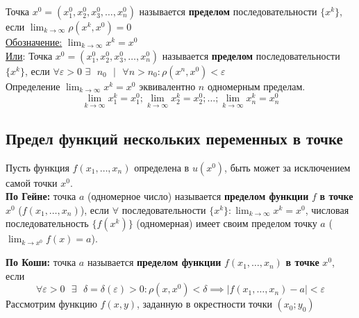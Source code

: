 \documentclass[12pt]{article}
\begin{document}
    Точка $x^0 = (x^0_1, x^0_2, x^0_3, \dots, x^0_n)$ называется \textbf{пределом} последовательности $\{x^k\}$, если $\lim_{k\to\infty} \rho(x^k, x^0) = 0$\\
    \underline{Обозначение:} $\lim_{k\to\infty}x^k=x^0$\\
    \underline{Или}: Точка $x^0 = (x^0_1, x^0_2, x^0_3, \dots, x^0_n)$ называется \textbf{пределом} последовательности $\{x^k\}$, если $\forall \varepsilon > 0$ $\exists \text{ } n_0 \text{ } \big| \text{ } \forall n > n_0 : \rho(x^n, x^0) < \varepsilon$\\
    Определение $\lim_{k\to\infty}x^k=x^0$ эквивалентно $n$ одномерным пределам.
    \[ \lim_{k\to\infty}x^k_1 = x^0_1; \lim_{k\to\infty}x^k_2 = x^0_2; \dots; \lim_{k\to\infty}x^k_n = x^0_n \]

    \subsection{Предел функций нескольких переменных в точке}
    \noindent Пусть функция $f(x_1, \dots, x_n)$ определена в $u(x^0)$, быть может за исключением самой точки $x^0$.\\
    \textbf{По Гейне:} точка $a$ (одномерное число) называется \textbf{пределом функции} $f$ \textbf{в точке} $x^0$ ($f(x_1, \dots, x_n)$), если $\forall$ последовательности $\{x^k\} : \lim_{k\to\infty}x^k=x^0$, числовая последовательность $\{ f(x^k) \}$ (одномерная) имеет своим пределом точку $a$ ($\lim_{k\to x^0}f(x)=a$).\par\noindent
    \textbf{По Коши:} точка $a$ называется \textbf{пределом функции} $f(x_1, \dots, x_n)$ \textbf{в точке} $x^0$, если
    \[ \forall \varepsilon > 0 \text{ } \exists \text{ } \delta = \delta(\varepsilon) > 0 : \rho(x, x^0) < \delta \implies |f(x_1, \dots, x_n) - a| < \varepsilon \]
    Рассмотрим функцию $f(x,y)$, заданную в окрестности точки $(x_0; y_0)$
\end{document}
